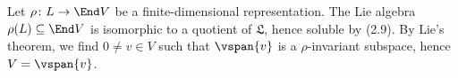 Let $\rho\colon L\to \End V$ be a finite-dimensional representation.
The Lie algebra $\rho(L) \subseteq \End V$ is isomorphic to a quotient of
$\mathfrak{L}$, hence soluble by (2.9). By Lie's theorem, we find
$0\neq v \in V$ such that $\vspan{v}$ is a $\rho$-invariant subspace, hence
$V = \vspan{v}$.
